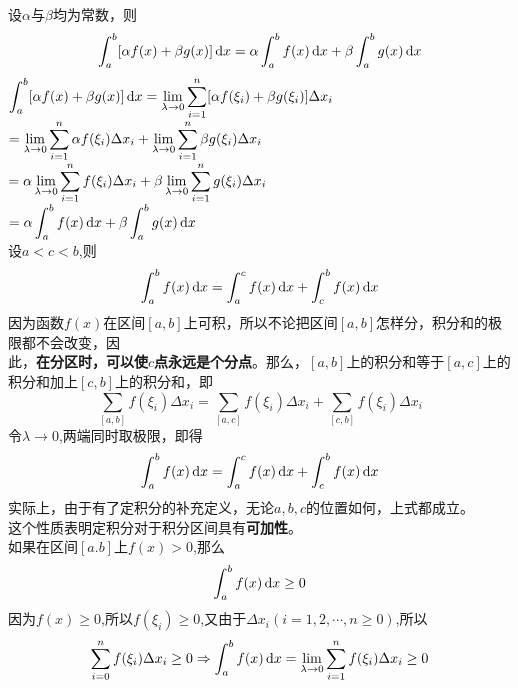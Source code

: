 \vspace*{-1em}
\theorem[定上下限积分性质1]
设$\alpha$与$\beta$均为常数，则
\begin{equation}
	\int_{a}^{b}[\alpha f(x)+\beta g(x)] \,{\rm{d}} x=\alpha\int_{a}^{b}f(x) \,{\rm{d}} x+\beta\int_{a}^{b}g(x) \,{\rm{d}} x
\end{equation}
\proof $\displaystyle\int_{a}^{b}[\alpha f(x)+\beta g(x)] \,{\rm{d}} x=\lim\limits_{\lambda\to0}\sum_{i=1}^{n}[\alpha f(\xi_i)+\beta g(\xi_i)]\Delta x_i$\vspace{-1em}\\
\hspace*{14.7em}$=\displaystyle\lim\limits_{\lambda\to0}\sum_{i=1}^{n}\alpha f(\xi_i)\Delta x_i+\lim\limits_{\lambda\to0}\sum_{i=1}^{n}\beta g(\xi_i)\Delta x_i$\\
\hspace*{14.7em}$=\displaystyle\alpha\lim\limits_{\lambda\to0}\sum_{i=1}^{n}f(\xi_i)\Delta x_i+\beta\lim\limits_{\lambda\to0}\sum_{i=1}^{n}g(\xi_i)\Delta x_i$\\
\hspace*{14.7em}$=\alpha \displaystyle\int_{a}^{b}f(x)\,{\rm{d}} x+\beta \int_{a}^{b}g(x)\,{\rm{d}} x$\\

\theorem[定上下限积分性质2]
设$a<c<b$,则
\begin{equation}
	\int_{a}^{b}f(x) \,{\rm{d}} x=\int_{a}^{c}f(x) \,{\rm{d}} x+\int_{c}^{b}f(x) \,{\rm{d}} x
\end{equation}
\proof 因为函数$f(x)$在区间$[a,b]$上可积，所以不论把区间$[a,b]$怎样分，积分和的极限都不会改变，因\vspace{-0.5em}\\ 此，\textbf{在分区时，可以使$c$点永远是个分点}。那么，$[a,b]$上的积分和等于$[a,c]$上的积分和加上$[c,b]$上的积分和，即
\begin{equation}
	\sum_{[a,b]}f(\xi_i)\Delta x_i=\sum_{[a,c]}f(\xi_i)\Delta x_i+\sum_{[c,b]}f(\xi_i)\Delta x_i
\end{equation}
令$\lambda\to0$,两端同时取极限，即得
\begin{equation}
	\int_{a}^{b}f(x) \,{\rm{d}} x=\int_{a}^{c}f(x) \,{\rm{d}} x+\int_{c}^{b}f(x) \,{\rm{d}} x
\end{equation}
\hspace*{2em} 实际上，由于有了定积分的补充定义，无论$a,b,c$的位置如何，上式都成立。\\
\hspace*{2em} 这个性质表明定积分对于积分区间具有\textbf{可加性}。\\

\theorem[定上下限积分性质3]
\label{theorem:1}
如果在区间$[a.b]$上$f(x)>0$,那么
\begin{equation}
	\int_{a}^{b}f(x) \,{\rm{d}} x\geq0
\end{equation}
\proof 因为$f(x)\geq 0$,所以$f(\xi_i)\geq0$,又由于$\Delta x_i(i=1,2,\cdots,n\geq0)$,所以\vspace*{-1em}
\begin{equation}
	\sum_{i=0}^{n}f(\xi_i)\Delta x_i\geq0 \Rightarrow \int_{a}^{b}f(x) \,{\rm{d}} x=\lim\limits_{\lambda\to0}\sum_{i=1}^{n}f(\xi_i)\Delta x_i\geq 0
\end{equation}

